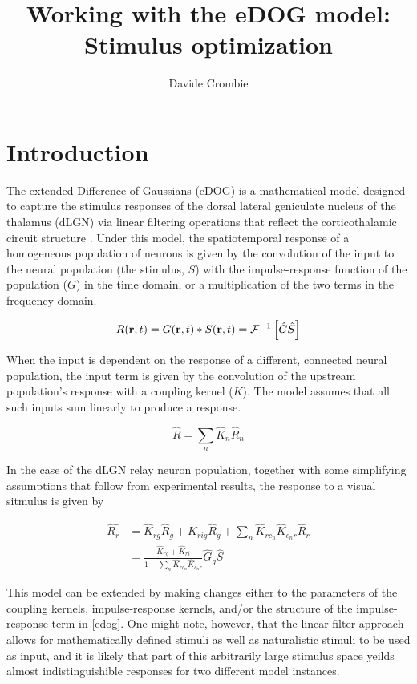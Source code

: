 \documentclass{article}
\title{Working with the eDOG model: Stimulus optimization}
\author{Davide Crombie}
\newcommand{\vect}[1]{\textbf{\textrm{#1}}}
\begin{document}
\maketitle

\section{Introduction} \label{introduction}
The extended Difference of Gaussians (eDOG) is a mathematical model designed to capture the stimulus responses of the dorsal lateral geniculate nucleus of the thalamus (dLGN) via linear filtering operations that reflect the corticothalamic circuit structure \citep{einevoll2012, mobarhan2018}.
Under this model, the spatiotemporal response of a homogeneous population of neurons is given by the convolution of the input to the neural population (the stimulus, $S$) with the impulse-response function of the population ($G$) in the time domain, or a multiplication of the two terms in the frequency domain.

\begin{equation} \label{impulseresp}
	R(\vect{r},t) = G(\vect{r},t)*S(\vect{r},t) = \mathcal{F}^{-1} \left[ \hat{G}\hat{S} \right]
\end{equation}

When the input is dependent on the response of a different, connected neural population, the input term is given by the convolution of the upstream population's response with a coupling kernel ($K$). 
The  model assumes that all such inputs sum linearly to produce a response.

\begin{equation*}
	\hat{R} = \sum_n{\hat{K}_n\hat{R}_n}
\end{equation*}

In the case of the dLGN relay neuron population, together with some simplifying assumptions that follow from experimental results, the response to a visual sitmulus is given by

\begin{align} \label{edog}
	\hat{R_r} & = \hat{K}_{rg}\hat{R}_g + \hat{K}_{rig}\hat{R}_g + 
				  \sum_n{\hat{K}_{rc_n}\hat{K}_{c_nr}\hat{R}_r} \nonumber \\
			  & = \frac{\hat{K}_{rg} + \hat{K}_{ri}}{1 - 
			  	  \sum_n{\hat{K}_{rc_n}\hat{K}_{c_nr}}} \hat{G}_g\hat{S} 
\end{align}

This model can be extended by making changes either to the parameters of the coupling kernels, impulse-response kernels, and/or the structure of the impulse-response term in \eqref{edog}. 
One might note, however, that the linear filter approach allows for mathematically defined stimuli as well as naturalistic stimuli to be used as input, and it is likely that part of this arbitrarily large stimulus space yeilds almost indistinguishible responses for two different model instances.
\end{document}
